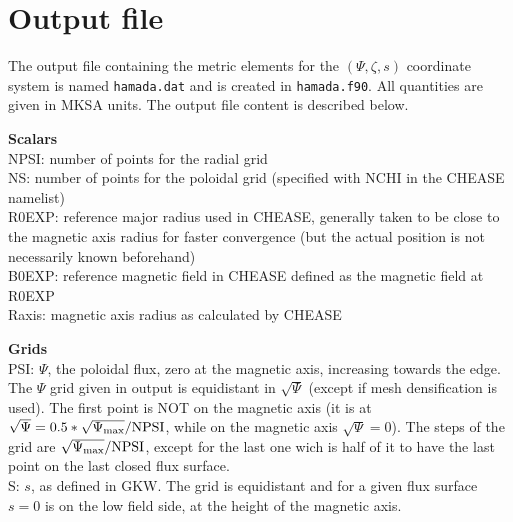 \documentclass[a4paper,12pt]{article}
\newcommand{\ind}[1]{\ensuremath{_{\rm{#1}}}}
\begin{document}
\section{Output file}
The output file containing the metric elements for the $(\Psi,\zeta,s)$ coordinate system is named \texttt{hamada.dat} and is created in \texttt{hamada.f90}. All quantities are given in MKSA units. The output file content is described below.

\textbf{Scalars}\\
NPSI: number of points for the radial grid\\
NS: number of points for the poloidal grid (specified with NCHI in the CHEASE namelist)\\
R0EXP: reference major radius used in CHEASE, generally taken to be close to the magnetic axis radius for faster convergence (but the actual position is not necessarily known beforehand)\\
B0EXP: reference magnetic field in CHEASE defined as the magnetic field at R0EXP\\
Raxis: magnetic axis radius as calculated by CHEASE
\vspace{0.5cm}

\textbf{Grids}\\
PSI: $\Psi$, the poloidal flux, zero at the magnetic axis, increasing towards the edge. The $\Psi$ grid given in output is equidistant in $\sqrt{\Psi}$ (except if mesh densification is used). The
first point is NOT on the magnetic axis (it is at $\sqrt{\Psi}=0.5*\sqrt{\Psi\ind{\max}}/\mathrm{NPSI}$, while on the magnetic axis $\sqrt{\Psi}=0$). The steps of the grid are
$\sqrt{\Psi\ind{\max}}/\mathrm{NPSI}$, except for the last one wich is half of it to have the last point on the last closed flux surface.\\
S: $s$, as defined in GKW. The grid is equidistant and for a given flux surface $s=0$ is on the low field side, at the height of the magnetic axis. 
\vspace{0.5cm}
\end{document}
